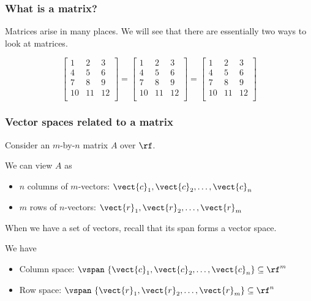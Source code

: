

\begin{frame}
  \frametitle{What is a matrix?}

  Matrices arise in many places.  We will see that there are
  essentially two ways to look at matrices.
  
  \[
  \left[
    \begin{array}{c|c|c}
      1 & 2 & 3 \\
      4 & 5 & 6 \\
      7 & 8 & 9 \\
      10 & 11 & 12 \\
    \end{array}
    \right]
  =
  \left[
    \begin{array}{ccc}
      1 & 2 & 3 \\
      4 & 5 & 6 \\
      7 & 8 & 9 \\
      10 & 11 & 12 \\
    \end{array}
    \right]
  =
  \left[
    \begin{array}{ccc}
      1 & 2 & 3 \\
      \hline
      4 & 5 & 6 \\
      \hline
      7 & 8 & 9 \\
      \hline
      10 & 11 & 12 \\
    \end{array}
    \right]
  \]
\end{frame}

\begin{frame}
  \frametitle{Vector spaces related to a matrix}

  Consider an $m$-by-$n$ matrix $A$ over $\rf$.

  \pause
  We can view $A$ as
  \begin{itemize}
  \item $n$ columns of $m$-vectors:
  $\vect{c}_1,\vect{c}_2,\ldots,\vect{c}_n$     
  \pause
  \item $m$ rows of $n$-vectors:
  $\vect{r}_1,\vect{r}_2,\ldots,\vect{r}_m$
  \end{itemize}

  \pause When we have a set of vectors, recall that its span forms a
  vector space.

  \vspace{0.2in}
  
  We have
  \pause
  \begin{itemize}
  \item Column space: $\vspan~\{\vect{c}_1,\vect{c}_2,\ldots,\vect{c}_n\} \subseteq \rf^{m}$     
    \pause
  \item Row space: $\vspan~\{\vect{r}_1,\vect{r}_2,\ldots,\vect{r}_m\} \subseteq \rf^{n}$
  \end{itemize}
\end{frame}

